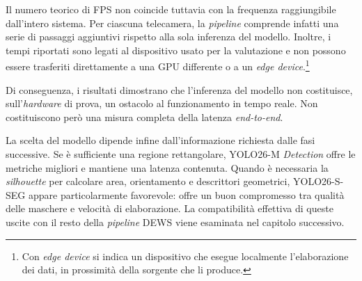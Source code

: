 Il numero teorico di FPS non coincide tuttavia con la frequenza raggiungibile dall'intero sistema. Per ciascuna telecamera, la \textit{pipeline} comprende infatti una serie di passaggi aggiuntivi rispetto alla sola inferenza del modello. Inoltre, i tempi riportati sono legati al dispositivo usato per la valutazione e non possono essere trasferiti direttamente a una GPU differente o a un \textit{edge device}.\footnote{Con \textit{edge device} si indica un dispositivo che esegue localmente l'elaborazione dei dati, in prossimità della sorgente che li produce.}

Di conseguenza, i risultati dimostrano che l'inferenza del modello non costituisce, sull'\textit{hardware} di prova, un ostacolo al funzionamento in tempo reale. Non costituiscono però una misura completa della latenza \textit{end-to-end}.

La scelta del modello dipende infine dall'informazione richiesta dalle fasi successive. Se è sufficiente una regione rettangolare, YOLO26-M \textit{Detection} offre le metriche migliori e mantiene una latenza contenuta. Quando è necessaria la \textit{silhouette} per calcolare area, orientamento e descrittori geometrici, YOLO26-S-SEG appare particolarmente favorevole: offre un buon compromesso tra qualità delle maschere e velocità di elaborazione. La compatibilità effettiva di queste uscite con il resto della \textit{pipeline} DEWS viene esaminata nel capitolo successivo.
